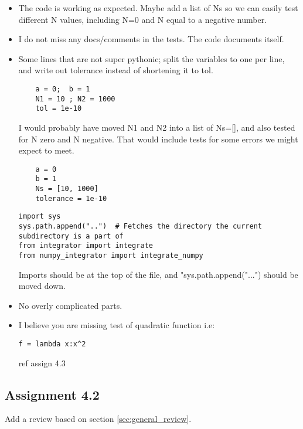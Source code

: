 \documentclass[a4paper]{article}
\begin{document}
\begin{itemize}
  \item The code is working as expected. Maybe add a list of Ns so we can easily test different N values, including N=0 and N equal to a negative number.
  
  \item I do not miss any docs/comments in the tests. The code documents itself.

\item Some lines that are not super pythonic; split the variables to one per line, and write out tolerance instead of shortening it to tol. 
	\begin{verbatim}
	a = 0;  b = 1
	N1 = 10 ; N2 = 1000
	tol = 1e-10
    \end{verbatim}
    I would probably have moved N1 and N2 into a list of Ns=[], and also tested for N zero and N negative.
That would include tests for some errors we might expect to meet.
    \begin{verbatim}
	a = 0
	b = 1
	Ns = [10, 1000]
	tolerance = 1e-10
    \end{verbatim}
    
      \begin{verbatim}
import sys
sys.path.append("..")  # Fetches the directory the current subdirectory is a part of
from integrator import integrate
from numpy_integrator import integrate_numpy
\end{verbatim}
Imports should be at the top of the file, and "sys.path.append("...") should be moved down.
  
    
    
  \item No overly complicated parts.

\item I believe you are missing test of quadratic function
i.e:
\begin{verbatim}
f = lambda x:x^2
\end{verbatim}
ref assign 4.3

\end{itemize}
  





\subsection*{Assignment 4.2} \label{sec:assignment5.2}
Add a review based on section \ref{sec:general_review}.
\end{document}
